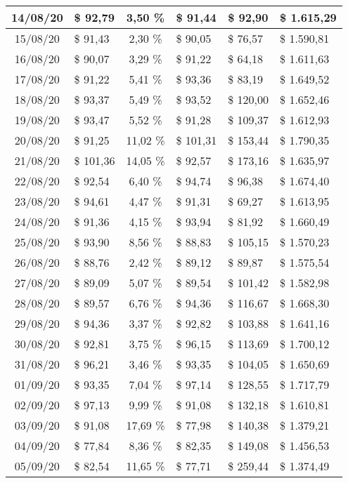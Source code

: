 \begin{center}
\begin{small}
\begin{longtable}{|c|l|c|l|l|l|}
14/08/20 & \$ 92,79 & 3,50 \% & \$ 91,44 & \$ 92,90 & \$ 1.615,29 \\ \hline
15/08/20 & \$ 91,43 & 2,30 \% & \$ 90,05 & \$ 76,57 & \$ 1.590,81 \\ \hline
16/08/20 & \$ 90,07 & 3,29 \% & \$ 91,22 & \$ 64,18 & \$ 1.611,63 \\ \hline
17/08/20 & \$ 91,22 & 5,41 \% & \$ 93,36 & \$ 83,19 & \$ 1.649,52 \\ \hline
18/08/20 & \$ 93,37 & 5,49 \% & \$ 93,52 & \$ 120,00 & \$ 1.652,46 \\ \hline
19/08/20 & \$ 93,47 & 5,52 \% & \$ 91,28 & \$ 109,37 & \$ 1.612,93 \\ \hline
20/08/20 & \$ 91,25 & 11,02 \% & \$ 101,31 & \$ 153,44 & \$ 1.790,35 \\ \hline
21/08/20 & \$ 101,36 & 14,05 \% & \$ 92,57 & \$ 173,16 & \$ 1.635,97 \\ \hline
22/08/20 & \$ 92,54 & 6,40 \% & \$ 94,74 & \$ 96,38 & \$ 1.674,40 \\ \hline
23/08/20 & \$ 94,61 & 4,47 \% & \$ 91,31 & \$ 69,27 & \$ 1.613,95 \\ \hline
24/08/20 & \$ 91,36 & 4,15 \% & \$ 93,94 & \$ 81,92 & \$ 1.660,49 \\ \hline
25/08/20 & \$ 93,90 & 8,56 \% & \$ 88,83 & \$ 105,15 & \$ 1.570,23 \\ \hline
26/08/20 & \$ 88,76 & 2,42 \% & \$ 89,12 & \$ 89,87 & \$ 1.575,54 \\ \hline
27/08/20 & \$ 89,09 & 5,07 \% & \$ 89,54 & \$ 101,42 & \$ 1.582,98 \\ \hline
28/08/20 & \$ 89,57 & 6,76 \% & \$ 94,36 & \$ 116,67 & \$ 1.668,30 \\ \hline
29/08/20 & \$ 94,36 & 3,37 \% & \$ 92,82 & \$ 103,88 & \$ 1.641,16 \\ \hline
30/08/20 & \$ 92,81 & 3,75 \% & \$ 96,15 & \$ 113,69 & \$ 1.700,12 \\ \hline
31/08/20 & \$ 96,21 & 3,46 \% & \$ 93,35 & \$ 104,05 & \$ 1.650,69 \\ \hline
01/09/20 & \$ 93,35 & 7,04 \% & \$ 97,14 & \$ 128,55 & \$ 1.717,79 \\ \hline
02/09/20 & \$ 97,13 & 9,99 \% & \$ 91,08 & \$ 132,18 & \$ 1.610,81 \\ \hline
03/09/20 & \$ 91,08 & 17,69 \% & \$ 77,98 & \$ 140,38 & \$ 1.379,21 \\ \hline
04/09/20 & \$ 77,84 & 8,36 \% & \$ 82,35 & \$ 149,08 & \$ 1.456,53 \\ \hline
05/09/20 & \$ 82,54 & 11,65 \% & \$ 77,71 & \$ 259,44 & \$ 1.374,49 \\ \hline

\end{longtable}
\end{small}
\end{center}
